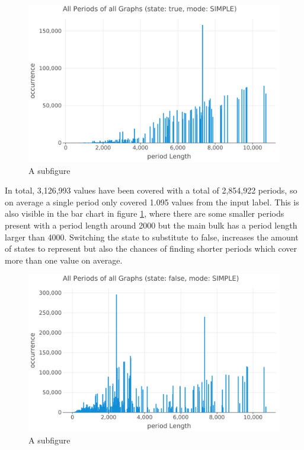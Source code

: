 \begin{figure}[h]
	\includegraphics[width=\linewidth]{charts/all-graphs-bar-char-strue-mSIMPLE.png}
	\caption{A subfigure}
	\label{fig:plot-all-periods-true-state}
\end{figure}

In total, 3,126,993 values have been covered with a total of 2,854,922 periods, so on average a single period only covered 1.095 values from the input label. This is also visible in the bar chart in figure \ref{fig:plot-all-periods-true-state}, where there are some smaller periods present with a period length around 2000 but the main bulk has a period length larger than 4000. Switching the state to substitute to false, increases the amount of states to represent but also the chances of finding shorter periods which cover more than one value on average.

\begin{figure}[h]
	\includegraphics[width=\linewidth]{charts/all-graphs-bar-char-sfalse-mSIMPLE.png}
	\caption{A subfigure}
	\label{fig:plot-all-periods-false-state}
\end{figure}

